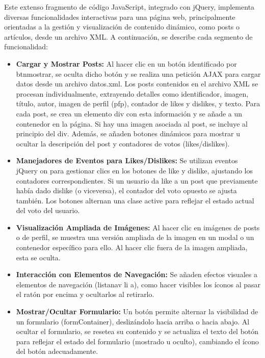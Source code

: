 \documentclass{article}
\begin{document}
Este extenso fragmento de código JavaScript, integrado con jQuery, implementa diversas funcionalidades interactivas para una página web, principalmente orientadas a la gestión y visualización de contenido dinámico, como posts o artículos, desde un archivo XML. A continuación, se describe cada segmento de funcionalidad:

\begin{itemize}
    \item \textbf{Cargar y Mostrar Posts:} Al hacer clic en un botón identificado por btnmostrar, se oculta dicho botón y se realiza una petición AJAX para cargar datos desde un archivo datos.xml. Los posts contenidos en el archivo XML se procesan individualmente, extrayendo detalles como identificador, imagen, título, autor, imagen de perfil (pfp), contador de likes y dislikes, y texto. Para cada post, se crea un elemento div con esta información y se añade a un contenedor en la página. Si hay una imagen asociada al post, se incluye al principio del div. Además, se añaden botones dinámicos para mostrar u ocultar la descripción del post y contadores de votos (likes/dislikes).

    \item \textbf{Manejadores de Eventos para Likes/Dislikes:} Se utilizan eventos jQuery on para gestionar clics en los botones de like y dislike, ajustando los contadores correspondientes. Si un usuario da like a un post que previamente había dado dislike (o viceversa), el contador del voto opuesto se ajusta también. Los botones alternan una clase active para reflejar el estado actual del voto del usuario.

    \item \textbf{Visualización Ampliada de Imágenes:} Al hacer clic en imágenes de posts o de perfil, se muestra una versión ampliada de la imagen en un modal o un contenedor específico para ello. Al hacer clic fuera de la imagen ampliada, esta se oculta.

    \item \textbf{Interacción con Elementos de Navegación:} Se añaden efectos visuales a elementos de navegación (listanav li a), como hacer visibles los íconos al pasar el ratón por encima y ocultarlos al retirarlo.

    \item \textbf{Mostrar/Ocultar Formulario:} Un botón permite alternar la visibilidad de un formulario (formContainer), deslizándolo hacia arriba o hacia abajo. Al ocultar el formulario, se resetea su contenido y se actualiza el texto del botón para reflejar el estado del formulario (mostrado u oculto), cambiando el ícono del botón adecuadamente.

\end{itemize}
\end{document}
